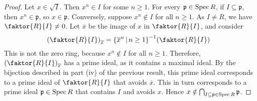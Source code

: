 \begin{proof}
    Let \( x \in \sqrt{I} \).
    Then \( x^n \in I \) for some \( n \geq 1 \).
    For every \( \mathfrak p \in \operatorname{Spec} R \), if \( I \subseteq \mathfrak p \), then \( x^n \in \mathfrak p \), so \( x \in \mathfrak p \).
    Conversely, suppose \( x^n \notin I \) for all \( n \geq 1 \).
    As \( I \neq R \), we have \( \faktor{R}{I} \neq 0 \).
    Let \( \overline x \) be the image of \( x \) in \( \faktor{R}{I} \), and consider
    \[ \qty(\faktor{R}{I})_{\overline x} = \qty{\overline x^n \midd n \geq 1}^{-1} \qty(\faktor{R}{I}) \]
    This is not the zero ring, because \( x^n \notin I \) for all \( n \geq 1 \).
    Therefore, \( \qty(\faktor{R}{I})_{\overline x} \) has a prime ideal, as it contains a maximal ideal.
    By the bijection described in part (iv) of the previous result, this prime ideal corresponds to a prime ideal of \( \faktor{R}{I} \) that avoids \( \overline x \).
    This in turn corresponds to a prime ideal \( \mathfrak p \in \operatorname{Spec} R \) that contains \( I \) and avoids \( x \).
    Hence \( x \notin \bigcap_{I \subseteq \mathfrak p \in \operatorname{Spec} R} \mathfrak p \).
\end{proof}

